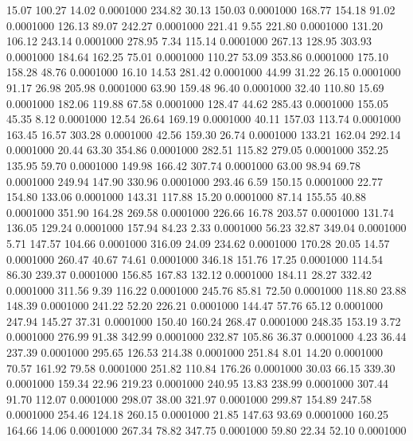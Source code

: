   15.07  100.27   14.02   0.0001000
 234.82   30.13  150.03   0.0001000
 168.77  154.18   91.02   0.0001000
 126.13   89.07  242.27   0.0001000
 221.41    9.55  221.80   0.0001000
 131.20  106.12  243.14   0.0001000
 278.95    7.34  115.14   0.0001000
 267.13  128.95  303.93   0.0001000
 184.64  162.25   75.01   0.0001000
 110.27   53.09  353.86   0.0001000
 175.10  158.28   48.76   0.0001000
  16.10   14.53  281.42   0.0001000
  44.99   31.22   26.15   0.0001000
  91.17   26.98  205.98   0.0001000
  63.90  159.48   96.40   0.0001000
  32.40  110.80   15.69   0.0001000
 182.06  119.88   67.58   0.0001000
 128.47   44.62  285.43   0.0001000
 155.05   45.35    8.12   0.0001000
  12.54   26.64  169.19   0.0001000
  40.11  157.03  113.74   0.0001000
 163.45   16.57  303.28   0.0001000
  42.56  159.30   26.74   0.0001000
 133.21  162.04  292.14   0.0001000
  20.44   63.30  354.86   0.0001000
 282.51  115.82  279.05   0.0001000
 352.25  135.95   59.70   0.0001000
 149.98  166.42  307.74   0.0001000
  63.00   98.94   69.78   0.0001000
 249.94  147.90  330.96   0.0001000
 293.46    6.59  150.15   0.0001000
  22.77  154.80  133.06   0.0001000
 143.31  117.88   15.20   0.0001000
  87.14  155.55   40.88   0.0001000
 351.90  164.28  269.58   0.0001000
 226.66   16.78  203.57   0.0001000
 131.74  136.05  129.24   0.0001000
 157.94   84.23    2.33   0.0001000
  56.23   32.87  349.04   0.0001000
   5.71  147.57  104.66   0.0001000
 316.09   24.09  234.62   0.0001000
 170.28   20.05   14.57   0.0001000
 260.47   40.67   74.61   0.0001000
 346.18  151.76   17.25   0.0001000
 114.54   86.30  239.37   0.0001000
 156.85  167.83  132.12   0.0001000
 184.11   28.27  332.42   0.0001000
 311.56    9.39  116.22   0.0001000
 245.76   85.81   72.50   0.0001000
 118.80   23.88  148.39   0.0001000
 241.22   52.20  226.21   0.0001000
 144.47   57.76   65.12   0.0001000
 247.94  145.27   37.31   0.0001000
 150.40  160.24  268.47   0.0001000
 248.35  153.19    3.72   0.0001000
 276.99   91.38  342.99   0.0001000
 232.87  105.86   36.37   0.0001000
   4.23   36.44  237.39   0.0001000
 295.65  126.53  214.38   0.0001000
 251.84    8.01   14.20   0.0001000
  70.57  161.92   79.58   0.0001000
 251.82  110.84  176.26   0.0001000
  30.03   66.15  339.30   0.0001000
 159.34   22.96  219.23   0.0001000
 240.95   13.83  238.99   0.0001000
 307.44   91.70  112.07   0.0001000
 298.07   38.00  321.97   0.0001000
 299.87  154.89  247.58   0.0001000
 254.46  124.18  260.15   0.0001000
  21.85  147.63   93.69   0.0001000
 160.25  164.66   14.06   0.0001000
 267.34   78.82  347.75   0.0001000
  59.80   22.34   52.10   0.0001000
